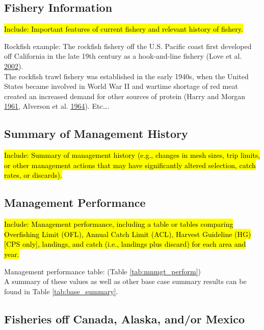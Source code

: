 \documentclass[12pt,]{article}
\begin{document}
\subsection{Fishery Information}\label{fishery-information}

\hl{Include: Important features of current fishery and relevant history of fishery.}

Rockfish example: The rockfish fishery off the U.S. Pacific coast first
developed off California in the late 19th century as a hook-and-line
fishery (Love et al. \protect\hyperlink{ref-Love2002}{2002}).\\
The rockfish trawl fishery was established in the early 1940s, when the
United States became involved in World War II and wartime shortage of
red meat created an increased demand for other sources of protein (Harry
and Morgan \protect\hyperlink{ref-Harry1961}{1961}, Alverson et al.
\protect\hyperlink{ref-Alverson1964}{1964}). Etc\ldots{}.

\subsection{Summary of Management
History}\label{summary-of-management-history}

\hl{Include: Summary of management history (e.g., changes in mesh sizes, trip 
limits, or other management actions that may have significantly altered selection, 
catch rates, or discards).}

\subsection{Management Performance}\label{management-performance-1}

\hl{Include: Management performance, including a table or tables comparing 
Overfishing Limit (OFL), Annual Catch Limit (ACL), Harvest Guideline (HG) 
[CPS only], landings, and catch (i.e., landings plus discard) for each area and year.}

Management performance table: (Table \ref{tab:mnmgt_perform})\\
A summary of these values as well as other base case summary results can
be found in Table \ref{tab:base_summary}.

\subsection{Fisheries off Canada, Alaska, and/or
Mexico}\label{fisheries-off-canada-alaska-andor-mexico}
\end{document}
